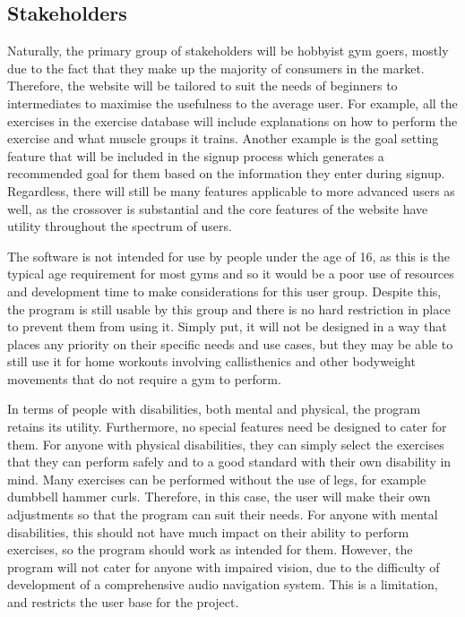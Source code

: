 \documentclass{article}
\begin{document}
\subsection{Stakeholders}
Naturally, the primary group of stakeholders will be hobbyist gym goers, mostly due to the fact that they make up the majority of consumers in the market. Therefore, the website will be tailored to suit the needs of beginners to intermediates to maximise the usefulness to the average user. For example, all the exercises in the exercise database will include explanations on how to perform the exercise and what muscle groups it trains. Another example is the goal setting feature that will be included in the signup process which generates a recommended goal for them based on the information they enter during signup. Regardless, there will still be many features applicable to more advanced users as well, as the crossover is substantial and the core features of the website have utility throughout the spectrum of users.

The software is not intended for use by people under the age of 16, as this is the typical age requirement for most gyms and so it would be a poor use of resources and development time to make considerations for this user group. Despite this, the program is still usable by this group and there is no hard restriction in place to prevent them from using it. Simply put, it will not be designed in a way that places any priority on their specific needs and use cases, but they may be able to still use it for home workouts involving callisthenics and other bodyweight movements that do not require a gym to perform. 

In terms of people with disabilities, both mental and physical, the program retains its utility. Furthermore, no special features need be designed to cater for them. For anyone with physical disabilities, they can simply select the exercises that they can perform safely and to a good standard with their own disability in mind. Many exercises can be performed without the use of legs, for example dumbbell hammer curls. Therefore, in this case, the user will make their own adjustments so that the program can suit their needs. For anyone with mental disabilities, this should not have much impact on their ability to perform exercises, so the program should work as intended for them. However, the program will not cater for anyone with impaired vision, due to the difficulty of development of a comprehensive audio navigation system. This is a limitation, and restricts the user base for the project. 
\end{document}
